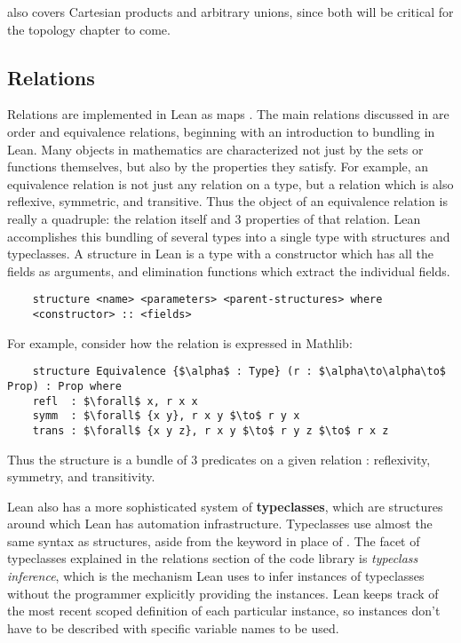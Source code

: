  also covers Cartesian products and arbitrary unions, since
both will be critical for the topology chapter to come.

\subsection{Relations}

Relations are implemented in Lean as maps . The 
main relations discussed in  are order and equivalence relations,
beginning with an introduction to bundling in Lean. Many objects in 
mathematics are characterized not just by the sets or functions themselves,
but also by the properties they satisfy. For example, an equivalence relation
is not just any relation on a type, but a relation which is also reflexive, 
symmetric, and transitive. Thus the object of an equivalence relation is really
a quadruple: the relation itself and 3 properties of that relation. Lean accomplishes
this bundling of several types into a single type with structures and typeclasses.
A structure in Lean is a type with a constructor which has all the fields
as arguments, and elimination functions which extract the individual fields.
\begin{lstlisting}
    structure <name> <parameters> <parent-structures> where
    <constructor> :: <fields>
\end{lstlisting}
For example, consider how the  relation is expressed in Mathlib:
\begin{lstlisting}
    structure Equivalence {$\alpha$ : Type} (r : $\alpha\to\alpha\to$ Prop) : Prop where
    refl  : $\forall$ x, r x x
    symm  : $\forall$ {x y}, r x y $\to$ r y x
    trans : $\forall$ {x y z}, r x y $\to$ r y z $\to$ r x z
\end{lstlisting}
Thus the structure  is a bundle of 3 predicates on a given
relation : reflexivity, symmetry, and transitivity.

Lean also has a more sophisticated system of \textbf{typeclasses}, which are
structures around which Lean has automation infrastructure. Typeclasses use 
almost the same syntax as structures, aside from the keyword  in
place of . The facet of typeclasses explained in the relations
section of the code library is \textit{typeclass inference}, which is the
mechanism Lean uses to infer instances of typeclasses without the programmer
explicitly providing the instances. Lean keeps track of the most recent scoped 
definition of each particular instance, so instances don't have to be described
with specific variable names to be used. 

